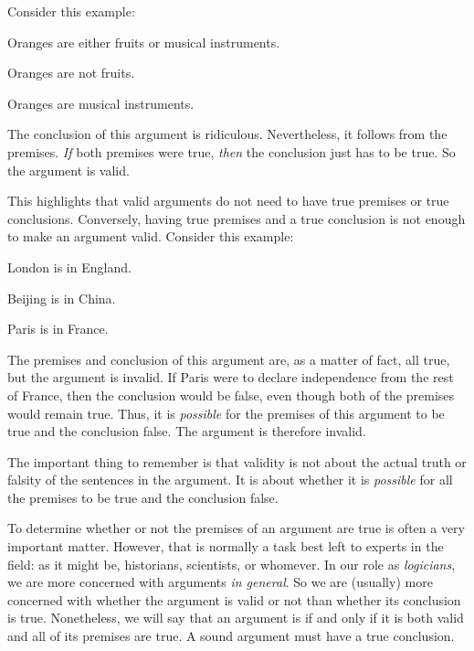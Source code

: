 Consider this example:
	\begin{earg}
		\item[] Oranges are either fruits or musical instruments.
		\item[] Oranges are not fruits.
		\item[\therefore] Oranges are musical instruments.
	\end{earg}
The conclusion of this argument is ridiculous. Nevertheless, it follows from the premises. \emph{If} both premises were true, \emph{then} the conclusion just has to be true. So the argument is valid. 

This highlights that valid arguments do not need to have true premises or true conclusions. Conversely, having true premises and a true conclusion is not enough to make an argument valid. Consider this example:
	\begin{earg}
		\item[] London is in England.
		\item[] Beijing is in China.
		\item[\therefore] Paris is in France.
	\end{earg}
The premises and conclusion of this argument are, as a matter of fact, all true, but the argument is invalid. If Paris were to declare independence from the rest of France, then the conclusion would be false, even though both of the premises would remain true. Thus, it is \emph{possible} for the premises of this argument to be true and the conclusion false. The argument is therefore invalid.

The important thing to remember is that validity is not about the actual truth or falsity of the sentences in the argument. It is about whether it is \emph{possible} for all the premises to be true and the conclusion false. 

To determine whether or not the premises of an argument are true is often a very important matter. However, that is normally a task best left to experts in the field: as it might be, historians, scientists, or whomever. In our role as \emph{logicians}, we are more concerned with arguments \emph{in general}. So we are (usually) more concerned with whether the argument is valid or not than whether its conclusion is true. Nonetheless, we will say that an argument is  if and only if it is both valid and all of its premises are true. A sound argument must have a true conclusion. 

